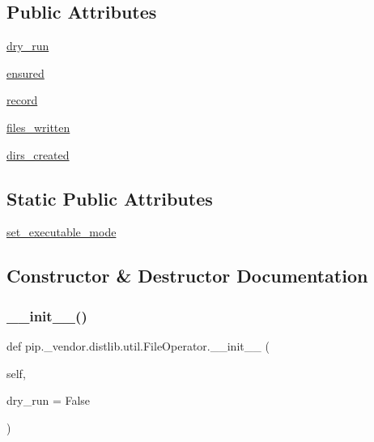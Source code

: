 \subsection*{Public Attributes}
\begin{DoxyCompactItemize}
\item 
\hyperlink{classpip_1_1__vendor_1_1distlib_1_1util_1_1FileOperator_adc669618b4578003f30e8f4578942fdd}{dry\+\_\+run}
\item 
\hyperlink{classpip_1_1__vendor_1_1distlib_1_1util_1_1FileOperator_a50822d94a523f8f4b4e344866c94b0cb}{ensured}
\item 
\hyperlink{classpip_1_1__vendor_1_1distlib_1_1util_1_1FileOperator_acb949d92a49bfda0958605c16bc8c8e5}{record}
\item 
\hyperlink{classpip_1_1__vendor_1_1distlib_1_1util_1_1FileOperator_a28ca91560bcfc79e3087b56f5a413739}{files\+\_\+written}
\item 
\hyperlink{classpip_1_1__vendor_1_1distlib_1_1util_1_1FileOperator_a1de15fc7ddb2b5f3cd5fd3ba3fbcb921}{dirs\+\_\+created}
\end{DoxyCompactItemize}
\subsection*{Static Public Attributes}
\begin{DoxyCompactItemize}
\item 
\hyperlink{classpip_1_1__vendor_1_1distlib_1_1util_1_1FileOperator_a127ef3127e2f71ddaceedc207a6ab1db}{set\+\_\+executable\+\_\+mode}
\end{DoxyCompactItemize}


\subsection{Constructor \& Destructor Documentation}
\mbox{\label{classpip_1_1__vendor_1_1distlib_1_1util_1_1FileOperator_a956f543f68c3a82f66bd47771f4ab0fa}} 
\subsubsection{\texorpdfstring{\+\_\+\+\_\+init\+\_\+\+\_\+()}{\_\_init\_\_()}}
{\footnotesize\ttfamily def pip.\+\_\+vendor.\+distlib.\+util.\+File\+Operator.\+\_\+\+\_\+init\+\_\+\+\_\+ (\begin{DoxyParamCaption}\item[{}]{self,  }\item[{}]{dry\+\_\+run = {\ttfamily False} }\end{DoxyParamCaption})}



